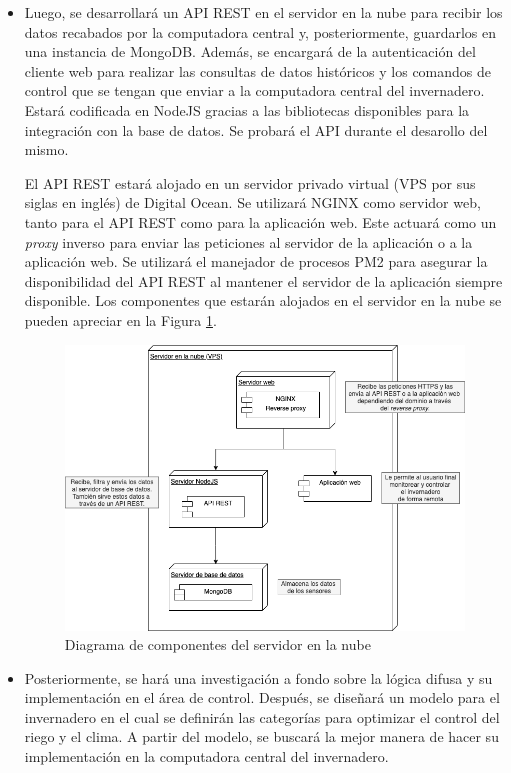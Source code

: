 \begin{itemize}
	\item Luego, se desarrollará un API REST en el servidor en la nube para recibir los datos recabados por la computadora central y, posteriormente, guardarlos en una instancia de MongoDB. Además, se encargará de la autenticación del cliente web para realizar las consultas de datos históricos y los comandos de control que se tengan que enviar a la computadora central del invernadero. Estará codificada en NodeJS gracias a las bibliotecas disponibles para la integración con la base de datos. Se probará el API durante el desarollo del mismo.

	El API REST estará alojado en un servidor privado virtual (VPS por sus siglas en inglés) de Digital Ocean. Se utilizará NGINX como servidor web, tanto para el API REST como para la aplicación web. Este actuará como un \textit{proxy} inverso para enviar las peticiones al servidor de la aplicación o a la aplicación web. Se utilizará el manejador de procesos PM2 para asegurar la disponibilidad del API REST al mantener el servidor de la aplicación siempre disponible. Los componentes que estarán alojados en el servidor en la nube se pueden apreciar en la Figura \ref{fig:componentes_vps}.

	\begin{figure}[!ht]
		\centering
		\includegraphics[width=.95\linewidth]{imagenes/diagramas/componentes_vps.png}
		\caption{Diagrama de componentes del servidor en la nube}
		\label{fig:componentes_vps}
	\end{figure}

	\item Posteriormente, se hará una investigación a fondo sobre la lógica difusa y su implementación en el área de control. Después, se diseñará un modelo para el invernadero en el cual se definirán las categorías para optimizar el control del riego y el clima. A partir del modelo, se buscará la mejor manera de hacer su implementación en la computadora central del invernadero.


\end{itemize}
